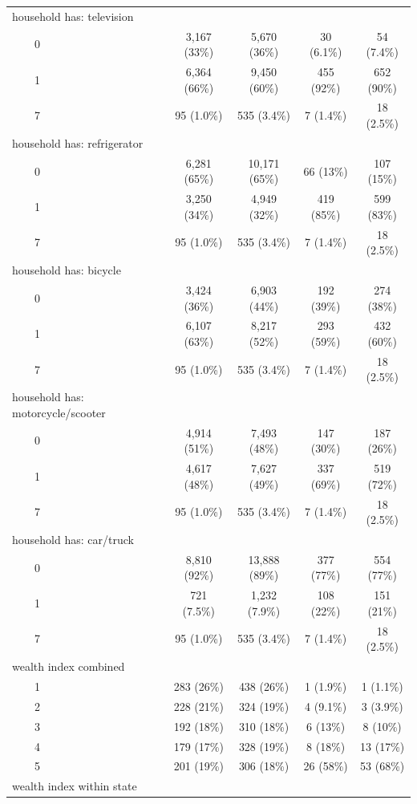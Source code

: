 \documentclass[
]{article}
\begin{document}
\begin{table}[t]
\begin{tabular*}{\linewidth}{@{\extracolsep{\fill}}lcccc}
household has: television &  &  &  &  \\ 
    0 & 3,167 (33\%) & 5,670 (36\%) & 30 (6.1\%) & 54 (7.4\%) \\ 
    1 & 6,364 (66\%) & 9,450 (60\%) & 455 (92\%) & 652 (90\%) \\ 
    7 & 95 (1.0\%) & 535 (3.4\%) & 7 (1.4\%) & 18 (2.5\%) \\ 
household has: refrigerator &  &  &  &  \\ 
    0 & 6,281 (65\%) & 10,171 (65\%) & 66 (13\%) & 107 (15\%) \\ 
    1 & 3,250 (34\%) & 4,949 (32\%) & 419 (85\%) & 599 (83\%) \\ 
    7 & 95 (1.0\%) & 535 (3.4\%) & 7 (1.4\%) & 18 (2.5\%) \\ 
household has: bicycle &  &  &  &  \\ 
    0 & 3,424 (36\%) & 6,903 (44\%) & 192 (39\%) & 274 (38\%) \\ 
    1 & 6,107 (63\%) & 8,217 (52\%) & 293 (59\%) & 432 (60\%) \\ 
    7 & 95 (1.0\%) & 535 (3.4\%) & 7 (1.4\%) & 18 (2.5\%) \\ 
household has: motorcycle/scooter &  &  &  &  \\ 
    0 & 4,914 (51\%) & 7,493 (48\%) & 147 (30\%) & 187 (26\%) \\ 
    1 & 4,617 (48\%) & 7,627 (49\%) & 337 (69\%) & 519 (72\%) \\ 
    7 & 95 (1.0\%) & 535 (3.4\%) & 7 (1.4\%) & 18 (2.5\%) \\ 
household has: car/truck &  &  &  &  \\ 
    0 & 8,810 (92\%) & 13,888 (89\%) & 377 (77\%) & 554 (77\%) \\ 
    1 & 721 (7.5\%) & 1,232 (7.9\%) & 108 (22\%) & 151 (21\%) \\ 
    7 & 95 (1.0\%) & 535 (3.4\%) & 7 (1.4\%) & 18 (2.5\%) \\ 
wealth index combined &  &  &  &  \\ 
    1 & 283 (26\%) & 438 (26\%) & 1 (1.9\%) & 1 (1.1\%) \\ 
    2 & 228 (21\%) & 324 (19\%) & 4 (9.1\%) & 3 (3.9\%) \\ 
    3 & 192 (18\%) & 310 (18\%) & 6 (13\%) & 8 (10\%) \\ 
    4 & 179 (17\%) & 328 (19\%) & 8 (18\%) & 13 (17\%) \\ 
    5 & 201 (19\%) & 306 (18\%) & 26 (58\%) & 53 (68\%) \\ 
wealth index within state &  &  &  &  \\ 

\end{tabular*}
\end{table}
\end{document}

